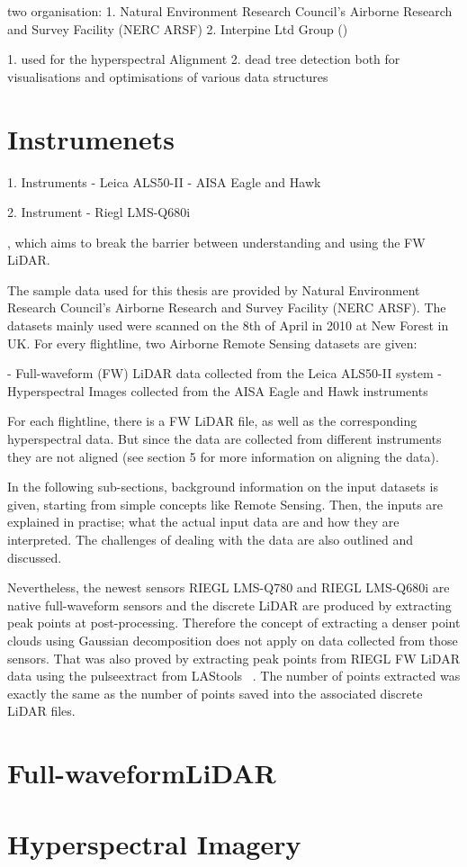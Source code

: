 \documentclass{subfiles}
\begin{document}
two organisation:
	1. Natural Environment Research Council’s Airborne Research and Survey Facility (NERC ARSF)
	2. Interpine Ltd Group () 
	
	1. used for the hyperspectral Alignment
	2. dead tree detection
	both for visualisations and optimisations of various data structures
	
	\section{Instrumenets}
	1. Instruments 
		- Leica ALS50-II
		- AISA Eagle and Hawk
		
	2. Instrument
		- Riegl LMS-Q680i
	
	\par 
	, which aims to break the barrier between understanding and using the FW LiDAR.
	

	The sample data used for this thesis are provided by Natural Environment Research Council’s Airborne Research and Survey Facility (NERC ARSF). The datasets mainly used were scanned on the 8th of April in 2010 at New Forest in UK. For every flightline, two Airborne Remote Sensing datasets are given: 
	
	-	Full-waveform (FW) LiDAR data collected from the Leica ALS50-II system
	-	Hyperspectral Images collected from the AISA Eagle and Hawk instruments
	
	For each flightline, there is a FW LiDAR file, as well as the corresponding hyperspectral data. But since the data are collected from different instruments they are not aligned (see section 5 for more information on aligning the data). 
	
	In the following sub-sections, background information on the input datasets is given, starting from simple concepts like Remote Sensing. Then, the inputs are explained in practise; what the actual input data are and how they are interpreted. The challenges of dealing with the data are also outlined and discussed. 


	\par Nevertheless, the newest sensors RIEGL LMS-Q780 and RIEGL LMS-Q680i are native full-waveform sensors and the discrete LiDAR are produced by extracting peak points at post-processing. Therefore the concept of extracting a denser point clouds using Gaussian decomposition does not apply on data collected from those sensors. That was also proved by extracting peak points from RIEGL FW LiDAR data using the pulseextract from LAStools ~\cite{LAStools}. The number of points extracted was exactly the same as the number of points saved into the associated discrete LiDAR files.


	\section{Full-waveformLiDAR}
	


	
	\section{Hyperspectral Imagery}
	
	
\end{document}
